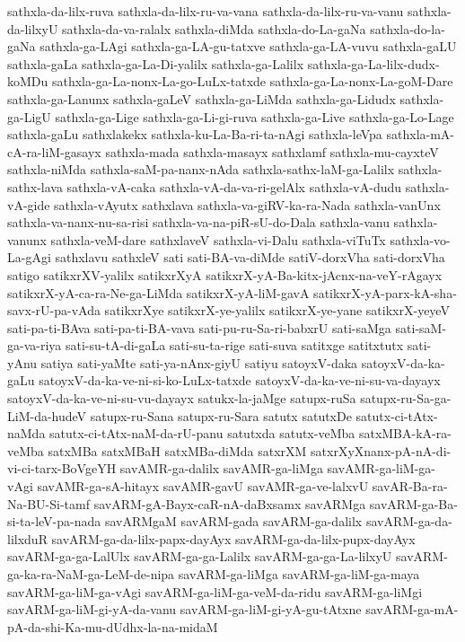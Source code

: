 {sathxla-da-lilx-ruva
sathxla-da-lilx-ru-va-vana
sathxla-da-lilx-ru-va-vanu
sathxla-da-lilxyU
sathxla-da-va-ralalx
sathxla-diMda
sathxla-do-La-gaNa
sathxla-do-la-gaNa
sathxla-ga-LAgi
sathxla-ga-LA-gu-tatxve
sathxla-ga-LA-vuvu
sathxla-gaLU
sathxla-gaLa
sathxla-ga-La-Di-yalilx
sathxla-ga-Lalilx
sathxla-ga-La-lilx-dudx-koMDu
sathxla-ga-La-nonx-La-go-LuLx-tatxde
sathxla-ga-La-nonx-La-goM-Dare
sathxla-ga-Lanunx
sathxla-gaLeV
sathxla-ga-LiMda
sathxla-ga-Lidudx
sathxla-ga-LigU
sathxla-ga-Lige
sathxla-ga-Li-gi-ruva
sathxla-ga-Live
sathxla-ga-Lo-Lage
sathxla-gaLu
sathxlakekx
sathxla-ku-La-Ba-ri-ta-nAgi
sathxla-leVpa
sathxla-mA-cA-ra-liM-gasayx
sathxla-mada
sathxla-masayx
sathxlamf
sathxla-mu-cayxteV
sathxla-niMda
sathxla-saM-pa-nanx-nAda
sathxla-sathx-laM-ga-Lalilx
sathxla-sathx-lava
sathxla-vA-caka
sathxla-vA-da-va-ri-gelAlx
sathxla-vA-dudu
sathxla-vA-gide
sathxla-vAyutx
sathxlava
sathxla-va-giRV-ka-ra-Nada
sathxla-vanUnx
sathxla-va-nanx-nu-sa-risi
sathxla-va-na-piR-sU-do-Dala
sathxla-vanu
sathxla-vanunx
sathxla-veM-dare
sathxlaveV
sathxla-vi-Dalu
sathxla-viTuTx
sathxla-vo-La-gAgi
sathxlavu
sathxleV
sati
sati-BA-va-diMde
satiV-dorxVha
sati-dorxVha
satigo
satikxrXV-yalilx
satikxrXyA
satikxrX-yA-Ba-kitx-jAcnx-na-veY-rAgayx
satikxrX-yA-ca-ra-Ne-ga-LiMda
satikxrX-yA-liM-gavA
satikxrX-yA-parx-kA-sha-savx-rU-pa-vAda
satikxrXye
satikxrX-ye-yalilx
satikxrX-ye-yane
satikxrX-yeyeV
sati-pa-ti-BAva
sati-pa-ti-BA-vava
sati-pu-ru-Sa-ri-babxrU
sati-saMga
sati-saM-ga-va-riya
sati-su-tA-di-gaLa
sati-su-ta-rige
sati-suva
satitxge
satitxtutx
sati-yAnu
satiya
sati-yaMte
sati-ya-nAnx-giyU
satiyu
satoyxV-daka
satoyxV-da-ka-gaLu
satoyxV-da-ka-ve-ni-si-ko-LuLx-tatxde
satoyxV-da-ka-ve-ni-su-va-dayayx
satoyxV-da-ka-ve-ni-su-vu-dayayx
satukx-la-jaMge
satupx-ruSa
satupx-ru-Sa-ga-LiM-da-hudeV
satupx-ru-Sana
satupx-ru-Sara
satutx
satutxDe
satutx-ci-tAtx-naMda
satutx-ci-tAtx-naM-da-rU-panu
satutxda
satutx-veMba
satxMBA-kA-ra-veMba
satxMBa
satxMBaH
satxMBa-diMda
satxrXM
satxrXyXnanx-pA-nA-di-vi-ci-tarx-BoVgeYH
savAMR-ga-dalilx
savAMR-ga-liMga
savAMR-ga-liM-ga-vAgi
savAMR-ga-sA-hitayx
savAMR-gavU
savAMR-ga-ve-lalxvU
savAR-Ba-ra-Na-BU-Si-tamf
savARM-gA-Bayx-caR-nA-daBxsamx
savARMga
savARM-ga-Ba-si-ta-leV-pa-nada
savARMgaM
savARM-gada
savARM-ga-dalilx
savARM-ga-da-lilxduR
savARM-ga-da-lilx-papx-dayAyx
savARM-ga-da-lilx-pupx-dayAyx
savARM-ga-ga-LalUlx
savARM-ga-ga-Lalilx
savARM-ga-ga-La-lilxyU
savARM-ga-ka-ra-NaM-ga-LeM-de-nipa
savARM-ga-liMga
savARM-ga-liM-ga-maya
savARM-ga-liM-ga-vAgi
savARM-ga-liM-ga-veM-da-ridu
savARM-ga-liMgi
savARM-ga-liM-gi-yA-da-vanu
savARM-ga-liM-gi-yA-gu-tAtxne
savARM-ga-mA-pA-da-shi-Ka-mu-dUdhx-la-na-midaM
}
